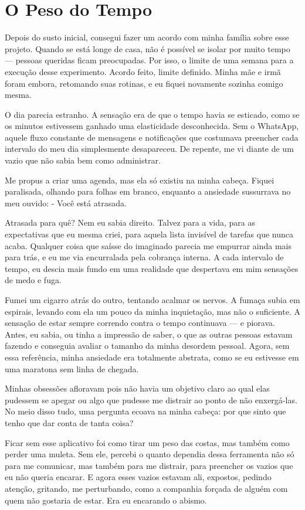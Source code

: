 \chapter{O Peso do Tempo}\label{capitulo3}

Depois do susto inicial, consegui fazer um acordo com minha família sobre esse projeto. Quando se está longe de casa, não é possível se isolar por muito tempo — pessoas queridas ficam preocupadas. Por isso, o limite de uma semana para a execução desse experimento. Acordo feito, limite definido. Minha mãe e irmã foram embora, retomando suas rotinas, e eu fiquei novamente sozinha comigo mesma.

O dia parecia estranho. A sensação era de que o tempo havia se esticado, como se os minutos estivessem ganhado uma elasticidade desconhecida. Sem o WhatsApp, aquele fluxo constante de mensagens e notificações que costumava preencher cada intervalo do meu dia simplesmente desapareceu. De repente, me vi diante de um vazio que não sabia bem como administrar.

Me propus a criar uma agenda, mas ela só existiu na minha cabeça. Fiquei paralisada, olhando para folhas em branco, enquanto a ansiedade sussurrava no meu ouvido:
- Você está atrasada.

Atrasada para quê? Nem eu sabia direito. Talvez para a vida, para as expectativas que eu mesma criei, para aquela lista invisível de tarefas que nunca acaba. Qualquer coisa que saísse do imaginado parecia me empurrar ainda mais para trás, e eu me via encurralada pela cobrança interna. A cada intervalo de tempo, eu descia mais fundo em uma realidade que despertava em mim sensações de medo e fuga.

Fumei um cigarro atrás do outro, tentando acalmar os nervos. A fumaça subia em espirais, levando com ela um pouco da minha inquietação, mas não o suficiente. A sensação de estar sempre correndo contra o tempo continuava — e piorava. Antes, eu sabia, ou tinha a impressão de saber, o que as outras pessoas estavam fazendo e conseguia avaliar o tamanho da minha desordem pessoal. Agora, sem essa referência, minha ansiedade era totalmente abstrata, como se eu estivesse em uma maratona sem linha de chegada. 

Minhas obsessões afloravam pois não havia um objetivo claro ao qual elas pudessem se apegar ou algo que pudesse me distrair ao ponto de não enxergá-las. No meio disso tudo, uma pergunta ecoava na minha cabeça: por que sinto que tenho que dar conta de tanta coisa?

Ficar sem esse aplicativo foi como tirar um peso das costas, mas também como perder uma muleta. Sem ele, percebi o quanto dependia dessa ferramenta não só para me comunicar, mas também para me distrair, para preencher os vazios que eu não queria encarar. E agora esses vazios estavam ali, expostos, pedindo atenção, gritando, me perturbando, como a companhia forçada de alguém com quem não gostaria de estar. Era eu encarando o abismo.

